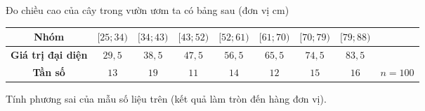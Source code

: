 \begin{ex}%
Đo chiều cao của cây trong vườn ươm ta có bảng sau (đơn vị cm)
\begin{center}
\begin{tabular}{|c|c|c|c|c|c|c|c|c|}
\hline
\textbf{Nhóm} & $[25;34)$ & $[34;43)$ & $[43;52)$ & $[52;61)$ & $[61;70)$ & $[70;79)$ & $[79;88)$ & \\
\hline
\textbf{Giá trị đại diện} & $29{,}5$ & $38{,}5$ & $47{,}5$ & $56{,}5$ & $65{,}5$ & $74{,}5$ & $83{,}5$ &\\
\hline
\textbf{Tần số} & $13$ & $19$ & $11$ & $14$ & $12$ & $15$ & $16$ & $n=100$\\
\hline
\end{tabular}
\end{center}
Tính phương sai của mẫu số liệu trên (kết quả làm tròn đến hàng đơn vị).
\end{ex}

